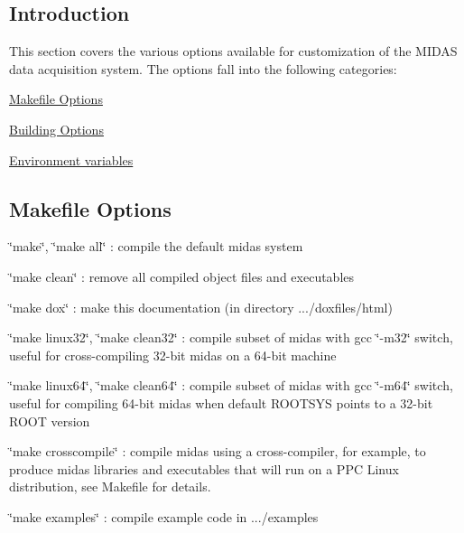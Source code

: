 \label{BuildingOptions_AppendixD}
\hypertarget{BuildingOptions_AppendixD}{}
 \par
 \hypertarget{BuildingOptions_BO_Intro}{}\subsection{Introduction}\label{BuildingOptions_BO_Intro}
This section covers the various options available for customization of the MIDAS data acquisition system. The options fall into the following categories:


\begin{DoxyItemize}
\item \hyperlink{BuildingOptions_BO_makefile_option}{Makefile Options}
\item \hyperlink{BuildingOptions_BO_building_option}{Building Options}
\item \hyperlink{BuildingOptions_BO_Environment_variables}{Environment variables}
\end{DoxyItemize}



 \hypertarget{BuildingOptions_BO_makefile_option}{}\subsection{Makefile Options}\label{BuildingOptions_BO_makefile_option}

\begin{DoxyItemize}
\item \char`\"{}make\char`\"{}, \char`\"{}make all\char`\"{} : compile the default midas system
\item \char`\"{}make clean\char`\"{} : remove all compiled object files and executables
\item \char`\"{}make dox\char`\"{} : make this documentation (in directory .../doxfiles/html)
\item \char`\"{}make linux32\char`\"{}, \char`\"{}make clean32\char`\"{} : compile subset of midas with gcc \char`\"{}-\/m32\char`\"{} switch, useful for cross-\/compiling 32-\/bit midas on a 64-\/bit machine
\item \char`\"{}make linux64\char`\"{}, \char`\"{}make clean64\char`\"{} : compile subset of midas with gcc \char`\"{}-\/m64\char`\"{} switch, useful for compiling 64-\/bit midas when default ROOTSYS points to a 32-\/bit ROOT version
\item \char`\"{}make crosscompile\char`\"{} : compile midas using a cross-\/compiler, for example, to produce midas libraries and executables that will run on a PPC Linux distribution, see Makefile for details.
\item \char`\"{}make examples\char`\"{} : compile example code in .../examples
\end{DoxyItemize}



